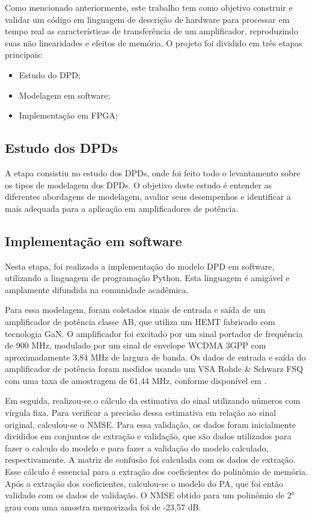Como mencionado anteriormente, este trabalho tem como objetivo construir e validar um código em linguagem de descrição de hardware para processar em tempo real as características de transferência de um amplificador, reproduzindo suas não linearidades e efeitos de memória. O projeto foi dividido em três etapas principais:

\begin{itemize}
\item Estudo do DPD;
\item Modelagem em software;
\item Implementação em FPGA;
\end{itemize}



\subsection{Estudo dos DPDs}
A etapa consistiu no estudo dos DPDs, onde foi feito todo o levantamento sobre os tipos de modelagem dos DPDs. O objetivo deste estudo é entender as diferentes abordagens de modelagem, avaliar seus desempenhos e identificar a mais adequada para a aplicação em amplificadores de potência.

\subsection{Implementação em software} \label{sec:implsoft}

Nesta etapa, foi realizada a implementação do modelo DPD em software, utilizando a linguagem de programação Python. Esta linguagem é amigável e amplamente difundida na comunidade acadêmica.

Para essa modelagem, foram coletados sinais de entrada e saída de um amplificador de potência classe AB, que utiliza um HEMT fabricado com tecnologia GaN. O amplificador foi excitado por um sinal portador de frequência de 900 MHz, modulado por um sinal de envelope WCDMA 3GPP com aproximadamente 3,84 MHz de largura de banda. Os dados de entrada e saída do amplificador de potência foram medidos usando um VSA Rohde \& Schwarz FSQ com uma taxa de amostragem de 61,44 MHz, conforme disponível em \cite{Bonfim2016}.

Em seguida, realizou-se o cálculo da estimativa do sinal utilizando números com vírgula fixa. Para verificar a precisão dessa estimativa em relação ao sinal original, calculou-se o NMSE. Para essa validação, os dados foram inicialmente divididos em conjuntos de extração e validação, que são dados utilizados para fazer o calculo do modelo e para fazer a validação do modelo calculado, respectivamente. A matriz de confusão foi calculada com os dados de extração. Esse cálculo é essencial para a extração dos coeficientes do polinômio de memória. Após a extração dos coeficientes, calculou-se o modelo do PA, que foi então validado com os dados de validação. O NMSE obtido para um polinômio de 2° grau com uma amostra memorizada foi de -23,57 dB.

